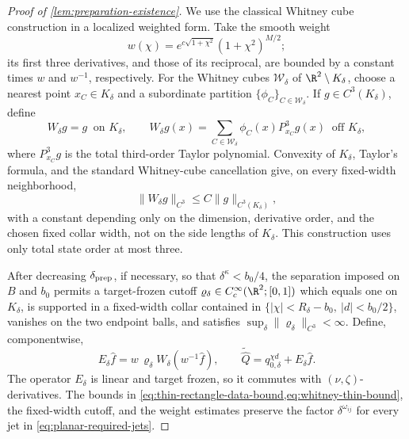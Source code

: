 \begin{proof}[Proof of \cref{lem:preparation-existence}]
We use the classical Whitney cube construction
\citep{whitney1934analytic} in a localized weighted form.  Take the smooth
weight
\[
 w(\chi)=e^{c\sqrt{1+\chi^2}}(1+\chi^2)^{M/2};
\]
its first three derivatives, and those of its reciprocal, are bounded by a
constant times \(w\) and \(w^{-1}\), respectively.  For the Whitney cubes
\(\mathcal W_\delta\) of \(\R^2\setminus K_\delta\), choose a nearest point
\(x_C\in K_\delta\) and a subordinate partition
\(\{\phi_C\}_{C\in\mathcal W_\delta}\).  If \(g\in C^3(K_\delta)\), define
\begin{equation}
 W_\delta g=g\ \text{ on }K_\delta,\qquad
 W_\delta g(x)=\sum_{C\in\mathcal W_\delta}
   \phi_C(x)P^3_{x_C}g(x)\ \text{ off }K_\delta,     \label{eq:whitney-thin-extension}
\end{equation}
where \(P^3_{x_C}g\) is the total third-order Taylor polynomial.  Convexity
of \(K_\delta\), Taylor's formula, and the standard Whitney-cube
cancellation give, on every fixed-width neighborhood,
\begin{equation}
 \|W_\delta g\|_{C^3}\le C\|g\|_{C^3(K_\delta)},     \label{eq:whitney-thin-bound}
\end{equation}
with a constant depending only on the dimension, derivative order, and the
chosen fixed collar width, not on the side lengths of \(K_\delta\).  This
construction uses only total state order at most three.

After decreasing \(\delta_{\rm prep}\), if necessary, so that
\(\delta^\kappa<b_0/4\), the separation imposed on \(B\) and \(b_0\)
permits a target-frozen cutoff
\(\varrho_\delta\in C_c^\infty(\R^2;[0,1])\) which equals one on
\(K_\delta\), is supported in a fixed-width collar contained in
\(\{|\chi|<R_\delta-b_0,\ |d|<b_0/2\}\), vanishes on the two endpoint
balls, and satisfies
\(\sup_\delta\|\varrho_\delta\|_{C^3}<\infty\).
Define, componentwise,
\begin{equation}
 E_\delta\widehat f
 =w\,\varrho_\delta
     W_\delta(w^{-1}\widehat f),\qquad
 \widetilde{\widehat Q}
 =q_{0,\delta}^{\chi d}+E_\delta\widehat f.          \label{eq:explicit-planar-completion}
\end{equation}
The operator \(E_\delta\) is linear and target frozen, so it commutes with
\((\nu,\zeta)\)-derivatives.  The bounds in
\cref{eq:thin-rectangle-data-bound,eq:whitney-thin-bound}, the fixed-width
cutoff, and the weight estimates preserve the factor
\(\delta^{\omega_{ij}}\) for every jet in
\cref{eq:planar-required-jets}.


\end{proof}
